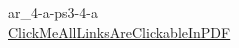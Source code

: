 ar_4-a-ps3-4-a\\
\href{https://drive.google.com/file/d/1nOf21f1U2UTi6qHcTheZRIuqMtOEo4Ul/view?usp=sharing}{ClickMeAllLinksAreClickableInPDF}
